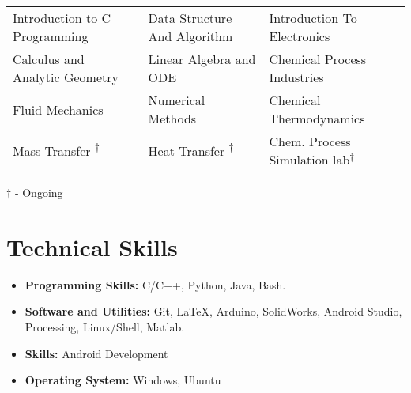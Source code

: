 \documentclass[10pt]{scrbook}
\begin{document}
\begin{center}
\begin{tabular}{m{5cm}  m{5cm} m{5cm}}

 
 Introduction to C Programming &
  Data Structure And Algorithm &
  Introduction To Electronics\\

 Calculus and Analytic Geometry &
 Linear Algebra and ODE &
 Chemical Process Industries \\
  Fluid Mechanics &
  Numerical Methods &
  Chemical Thermodynamics \\
  Mass Transfer \textsuperscript{$\dagger$}&
  Heat Transfer \textsuperscript{$\dagger$}&
  Chem. Process Simulation lab\textsuperscript{$\dagger$}\\


\end{tabular}

\begin{flushright}
    
    \small{$\dagger$ - Ongoing}
\end{flushright}
\end{center}


\section*{Technical Skills}
\begin{itemize}
\item \textbf{Programming Skills: } C/C++, Python, Java, Bash. 
\item \textbf{Software and Utilities: } Git, \LaTeX, Arduino, SolidWorks, Android Studio, Processing, Linux/Shell, Matlab.
\item \textbf{Skills: } Android Development
\item \textbf{Operating System: } Windows, Ubuntu  
\end{itemize}
\end{document}
